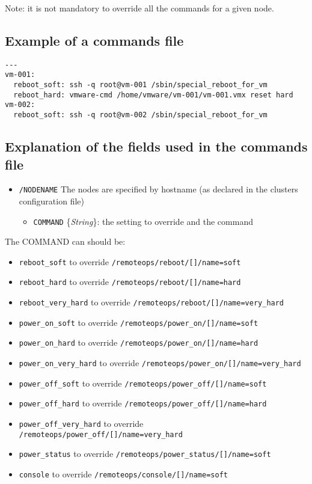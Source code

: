 \documentclass[a4wide,10pt,oneside]{book}
\newcommand{\ypath}[1]{\texttt{#1}}
\newcommand{\yfield}[2]{\texttt{#1} {\small\{{\emph{#2}}\}}:}
\begin{document}
Note: it is not mandatory to override all the commands for a given node.

\subsection{Example of a commands file\\}
\begin{small}
\begin{verbatim}
---
vm-001:
  reboot_soft: ssh -q root@vm-001 /sbin/special_reboot_for_vm
  reboot_hard: vmware-cmd /home/vmware/vm-001/vm-001.vmx reset hard
vm-002:
  reboot_soft: ssh -q root@vm-002 /sbin/special_reboot_for_vm
\end{verbatim}
\end{small}

\subsection{Explanation of the fields used in the commands file\\}
\begin{itemize}
  \item \ypath{/NODENAME} The nodes are specified by hostname (as declared in the clusters configuration file)
  \begin{itemize}
    \item \yfield{COMMAND}{String} the setting to override and the command
  \end{itemize}
\end{itemize}

The COMMAND can should be:
\begin{itemize}
  \item \texttt{reboot\_soft} to override \ypath{/remoteops/reboot/[]/name=soft}
  \item \texttt{reboot\_hard} to override \ypath{/remoteops/reboot/[]/name=hard}
  \item \texttt{reboot\_very\_hard} to override \ypath{/remoteops/reboot/[]/name=very\_hard}
  \item \texttt{power\_on\_soft} to override \ypath{/remoteops/power\_on/[]/name=soft}
  \item \texttt{power\_on\_hard} to override \ypath{/remoteops/power\_on/[]/name=hard}
  \item \texttt{power\_on\_very\_hard} to override \ypath{/remoteops/power\_on/[]/name=very\_hard}
  \item \texttt{power\_off\_soft} to override \ypath{/remoteops/power\_off/[]/name=soft}
  \item \texttt{power\_off\_hard} to override \ypath{/remoteops/power\_off/[]/name=hard}
  \item \texttt{power\_off\_very\_hard} to override \ypath{/remoteops/power\_off/[]/name=very\_hard}
  \item \texttt{power\_status} to override \ypath{/remoteops/power\_status/[]/name=soft}
  \item \texttt{console} to override \ypath{/remoteops/console/[]/name=soft}
\end{itemize}
\end{document}
